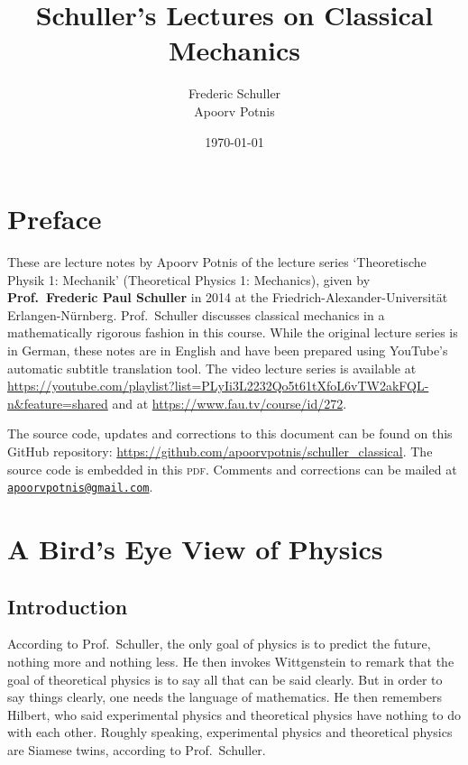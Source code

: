 \documentclass[a4 paper, oneside, 12pt]{book}
\title{Schuller's Lectures on Classical Mechanics}
\author{Frederic Schuller\\Apoorv Potnis}
\date{\today}
\theoremstyle{definition}
\begin{document}
	\hypertarget{TitlePage}{}
	\maketitle

	\chapter*{Preface}
	\hypertarget{Preface}{}
	These are lecture notes by Apoorv Potnis of the lecture series `Theoretische Physik 1: Mechanik' (Theoretical Physics 1: Mechanics), given by \textbf{Prof.\ Frederic Paul Schuller} in 2014 at the Friedrich-Alexander-Universität Erlangen-Nürnberg. Prof.\ Schuller discusses classical mechanics in a mathematically rigorous fashion in this course. While the original lecture series is in German, these notes are in English and have been prepared using YouTube's automatic subtitle translation tool. The video lecture series is available at \url{https://youtube.com/playlist?list=PLyIi3L2232Qo5t61tXfoL6vTW2akFQL-n&feature=shared} and at \url{https://www.fau.tv/course/id/272}.

	The source code, updates and corrections to this document can be found on this GitHub repository: \url{https://github.com/apoorvpotnis/schuller_classical}. The source code is embedded in this \textsc{pdf}. Comments and corrections can be mailed at \href{mailto:apoorvpotnis@gmail.com}{\texttt{apoorvpotnis@gmail.com}}.
	\clearpage

	\hypertarget{Contents}{}
	\tableofcontents

	\chapter{A Bird's Eye View of Physics}

	\section{Introduction}

	According to Prof.\ Schuller, the only goal of physics is to predict the future, nothing more and nothing less. He then invokes Wittgenstein to remark that the goal of theoretical physics is to say all that can be said clearly. But in order to say things clearly, one needs the language of mathematics. He then remembers Hilbert, who said experimental physics and theoretical physics have nothing to do with each other. Roughly speaking, experimental physics and theoretical physics are Siamese twins, according to Prof.\ Schuller.
\end{document}
